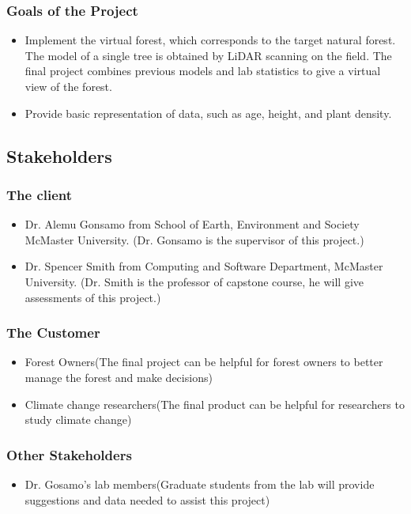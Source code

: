 \documentclass{article}
\begin{document}
\subsubsection{Goals of the Project}
\begin{itemize}
    \item Implement the virtual forest, which corresponds to the target natural forest. The model of a single tree is obtained by LiDAR scanning on the field. The final project combines previous models and lab statistics to give a virtual view of the forest. 
    \item Provide basic representation of data, such as age, height, and plant density. 
\end{itemize}

\subsection{Stakeholders}
\subsubsection{The client}
\begin{itemize}
    \item Dr. Alemu Gonsamo from School of Earth, Environment and Society McMaster University. (Dr. Gonsamo is the supervisor of this project.)
    \item Dr. Spencer Smith from Computing and Software Department, McMaster University. (Dr. 
    Smith is the professor of capstone course, he will give assessments of this project.)
\end{itemize}
\subsubsection{The Customer}
\begin{itemize}
    \item Forest Owners(The final project can be helpful for forest owners to better manage the 
    forest and make decisions)
    \item Climate change researchers(The final product can be helpful for researchers to 
    study climate change)
\end{itemize}
\subsubsection{Other Stakeholders}
\begin{itemize}
    \item Dr. Gosamo's lab members(Graduate students from the lab will provide suggestions and
    data needed to assist this project)
\end{itemize}
\end{document}
